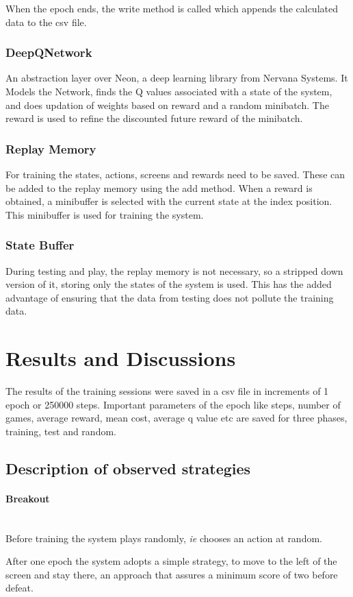 \documentclass[a4paper,11pt]{article}
\newcommand{\mparagraph}[1]{\paragraph{#1}\mbox{}\\}
\begin{document}
				When the epoch ends, the write method is called which appends the calculated data to the csv file.

			\subsubsection{DeepQNetwork}
				An abstraction layer over Neon, a deep learning library from Nervana Systems. It Models the Network, finds the Q values associated with a state of the system, and does updation of weights based on reward and a random minibatch. The reward is used to refine the discounted future reward of the minibatch.

			\subsubsection{Replay Memory}
				For training the states, actions, screens and rewards need to be saved. These can be added to the replay memory using the add method. When a reward is obtained, a minibuffer is selected with the current state at the index position. This minibuffer is used for training the system.

			\subsubsection{State Buffer}
				During testing and play, the replay memory is not necessary, so a stripped down version of it, storing only the states of the system is used. This has the added advantage of ensuring that the data from testing does not pollute the training data.

	\section{Results and Discussions}
		The results of the training sessions were saved in a csv file in increments of 1 epoch or 250000 steps. Important parameters of the epoch like steps, number of games, average reward, mean cost, average q value etc are saved for three phases, training, test and random.


		\subsection{Description of observed strategies}
			\mparagraph{Breakout}
				Before training the system plays randomly, \emph{ie} chooses an action at random. 

				After one epoch the system adopts a simple strategy, to move to the left of the screen and stay there, an approach that assures a minimum score of two before defeat.
\end{document}
